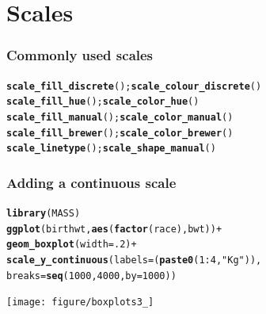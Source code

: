 \documentclass{beamer}\usepackage[]{graphicx}\usepackage[]{color}
\makeatletter
\newcommand{\hlstr}[1]{\textcolor[rgb]{0.192,0.494,0.8}{#1}}%
\newcommand{\hlkwd}[1]{\textcolor[rgb]{0.737,0.353,0.396}{\textbf{#1}}}%
\newenvironment{kframe}{%
 \def\at@end@of@kframe{}%
 \ifinner\ifhmode%
  \def\at@end@of@kframe{\end{minipage}}%
  \begin{minipage}{\columnwidth}%
 \fi\fi%
 \def\FrameCommand##1{\hskip\@totalleftmargin \hskip-\fboxsep
 \colorbox{shadecolor}{##1}\hskip-\fboxsep
     \hskip-\linewidth \hskip-\@totalleftmargin \hskip\columnwidth}%
 \MakeFramed {\advance\hsize-\width
   \@totalleftmargin\z@ \linewidth\hsize
   \@setminipage}}%
 {\par\unskip\endMakeFramed%
 \at@end@of@kframe}
\newenvironment{knitrout}{}{} %
\makeatother
\begin{document}

\section*{Scales}
\frame{\sectionpage}


\begin{frame}[fragile]
\frametitle{Commonly used scales}
\begin{knitrout}\footnotesize
{}\color{fgcolor}\begin{kframe}
\begin{alltt}
\hlkwd{scale_fill_discrete}(); \hlkwd{scale_colour_discrete}()
\hlkwd{scale_fill_hue}(); \hlkwd{scale_color_hue}()
\hlkwd{scale_fill_manual}();  \hlkwd{scale_color_manual}()
\hlkwd{scale_fill_brewer}(); \hlkwd{scale_color_brewer}()
\hlkwd{scale_linetype}(); \hlkwd{scale_shape_manual}()
\end{alltt}
\end{kframe}
\end{knitrout}

\end{frame}


\begin{frame}[fragile]
\frametitle{Adding a continuous scale}
\begin{knitrout}\footnotesize
{}\color{fgcolor}\begin{kframe}
\begin{alltt}
\hlkwd{library}(MASS)
\hlkwd{ggplot}(birthwt, \hlkwd{aes}(\hlkwd{factor}(race), bwt)) +
\hlkwd{geom_boxplot}(width = .2) +
\hlkwd{scale_y_continuous}(labels = (\hlkwd{paste0}(1:4, \hlstr{" Kg"})),
breaks = \hlkwd{seq}(1000, 4000, by = 1000))
\end{alltt}
\end{kframe}

{\centering \texttt{[image: figure/boxplots3\_]} 

}



\end{knitrout}

\end{frame}
\end{document}
